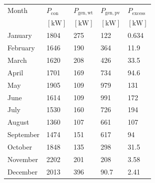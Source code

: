 \begin{table}
\label{tab: MonthlyPower}
\begin{tabular}{lllll}
\toprule
Month & $P_{\mathrm{con}}$ & $P_{\mathrm{gen,wt}}$ & $P_{\mathrm{gen,pv}}$ & $P_{\mathrm{excess}}$ \\
 & $\left[\mathrm{kW}\right]$ & $\left[\mathrm{kW}\right]$ & $\left[\mathrm{kW}\right]$ & $\left[\mathrm{kW}\right]$ \\
\midrule
January & 1804 & 275 & 122 & 0.634 \\
February & 1646 & 190 & 364 & 11.9 \\
March & 1620 & 208 & 426 & 33.5 \\
April & 1701 & 169 & 734 & 94.6 \\
May & 1905 & 109 & 979 & 131 \\
June & 1614 & 109 & 991 & 172 \\
July & 1530 & 160 & 726 & 194 \\
August & 1360 & 107 & 661 & 107 \\
September & 1474 & 151 & 617 & 94 \\
October & 1848 & 135 & 298 & 31.5 \\
November & 2202 & 201 & 208 & 3.58 \\
December & 2013 & 396 & 90.7 & 2.41 \\
\bottomrule
\end{tabular}
\end{table}
